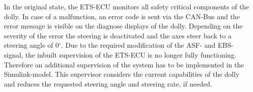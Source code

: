 \documentclass[ExampleMasters.tex]{subfiles}
\begin{document}
In the original state, the \gls{ETS}-\gls{ECU} monitors all safety critical components of the dolly. In case of a malfunction, an error code is sent via the \gls{CAN}-Bus and the error message is visible on the diagnose displays of the dolly. Depending on the severity of the error the steering is deactivated and the axes steer back to a steering angle of 0$^\circ$.
Due to the required modification of the \gls{ASF}- and \gls{EBS}-signal, the inbuilt supervision of the \gls{ETS}-\gls{ECU} is no longer fully functioning. Therefore an additional supervision of the system has to be implemented in the Simulink-model. This supervisor considers the current capabilities of the dolly and reduces the requested steering angle and steering rate, if needed. 
\end{document}
